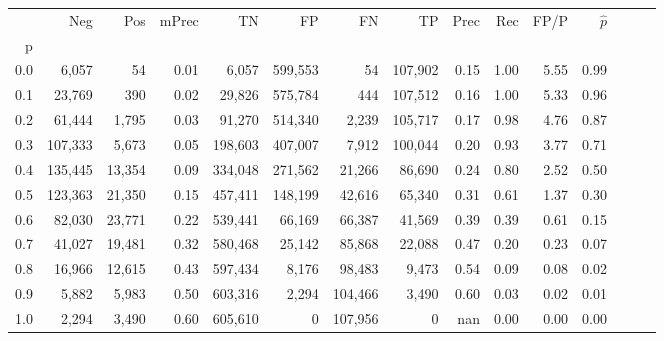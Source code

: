 \begin{tabular}{rrrrrrrrrrrrrrr}
\toprule
{} &      Neg &     Pos & mPrec &       TN &       FP &       FN &       TP &  Prec &   Rec &  FP/P & $\hat{p}$ \\
p   &          &         &       &          &          &          &          &       &       &       &           \\
\midrule
0.0 &    6,057 &      54 &  0.01 &    6,057 &  599,553 &       54 &  107,902 &  0.15 &  1.00 &  5.55 &      0.99 \\
0.1 &   23,769 &     390 &  0.02 &   29,826 &  575,784 &      444 &  107,512 &  0.16 &  1.00 &  5.33 &      0.96 \\
0.2 &   61,444 &   1,795 &  0.03 &   91,270 &  514,340 &    2,239 &  105,717 &  0.17 &  0.98 &  4.76 &      0.87 \\
0.3 &  107,333 &   5,673 &  0.05 &  198,603 &  407,007 &    7,912 &  100,044 &  0.20 &  0.93 &  3.77 &      0.71 \\
0.4 &  135,445 &  13,354 &  0.09 &  334,048 &  271,562 &   21,266 &   86,690 &  0.24 &  0.80 &  2.52 &      0.50 \\
0.5 &  123,363 &  21,350 &  0.15 &  457,411 &  148,199 &   42,616 &   65,340 &  0.31 &  0.61 &  1.37 &      0.30 \\
0.6 &   82,030 &  23,771 &  0.22 &  539,441 &   66,169 &   66,387 &   41,569 &  0.39 &  0.39 &  0.61 &      0.15 \\
0.7 &   41,027 &  19,481 &  0.32 &  580,468 &   25,142 &   85,868 &   22,088 &  0.47 &  0.20 &  0.23 &      0.07 \\
0.8 &   16,966 &  12,615 &  0.43 &  597,434 &    8,176 &   98,483 &    9,473 &  0.54 &  0.09 &  0.08 &      0.02 \\
0.9 &    5,882 &   5,983 &  0.50 &  603,316 &    2,294 &  104,466 &    3,490 &  0.60 &  0.03 &  0.02 &      0.01 \\
1.0 &    2,294 &   3,490 &  0.60 &  605,610 &        0 &  107,956 &        0 &   nan &  0.00 &  0.00 &      0.00 \\
\bottomrule
\end{tabular}
